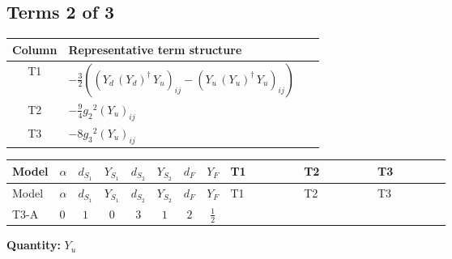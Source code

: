 \documentclass[8pt]{article}
\begin{document}
\begin{landscape}
\subsection*{Terms 2 of 3}
\begin{center}
\begin{tabular}{@{}c >{\raggedright\arraybackslash}p{0.82\linewidth}@{}}
\toprule
Column & Representative term structure \\
\midrule
T1 & \(\displaystyle -\frac{3}{2} (\left({Y_d}\,\left({Y_d}\right)^{\dagger}\,{Y_u}\right)_{ij}-\left({Y_u}\,\left({Y_u}\right)^{\dagger}\,{Y_u}\right)_{ij})\) \\
\midrule
T2 & \(\displaystyle -\frac{9}{4} {g_2}^2 \left({Y_u}\right)_{ij}\) \\
\midrule
T3 & \(\displaystyle -8 {g_3}^2 \left({Y_u}\right)_{ij}\) \\
\midrule
\bottomrule
\end{tabular}
\end{center}
\smallskip
\tiny
\begin{longtable}{@{}llcccccc >{\raggedright\arraybackslash}p{0.21\linewidth} >{\raggedright\arraybackslash}p{0.21\linewidth} >{\raggedright\arraybackslash}p{0.21\linewidth}@{}}
\toprule
Model & $\alpha$ & $d_{S_1}$ & $Y_{S_1}$ & $d_{S_2}$ & $Y_{S_2}$ & $d_F$ & $Y_F$ & T1 & T2 & T3 \\
\midrule
\endfirsthead
\toprule
Model & $\alpha$ & $d_{S_1}$ & $Y_{S_1}$ & $d_{S_2}$ & $Y_{S_2}$ & $d_F$ & $Y_F$ & T1 & T2 & T3 \\
\midrule
\endhead
T3-A & $0$ & $1$ & $0$ & $3$ & $1$ & $2$ & $\frac{1}{2}$ & \scriptsize\adjustbox{max width=\linewidth}{$\begin{gathered} -\frac{3}{2} (\left({Y_d}\,\left({Y_d}\right)^{\dagger}\,{Y_u}\right)_{ij}-\left({Y_u}\,\left({Y_u}\right)^{\dagger}\,{Y_u}\right)_{ij})\end{gathered}$} & \scriptsize\adjustbox{max width=\linewidth}{$\begin{gathered} -\frac{9}{4} {g_2}^2 \left({Y_u}\right)_{ij}\end{gathered}$} & \scriptsize\adjustbox{max width=\linewidth}{$\begin{gathered} -8 {g_3}^2 \left({Y_u}\right)_{ij}\end{gathered}$} \\
\midrule
\bottomrule
\end{longtable}
\clearpage
\noindent\textbf{Quantity: }$Y_u$\par\smallskip

\end{landscape}
\end{document}

